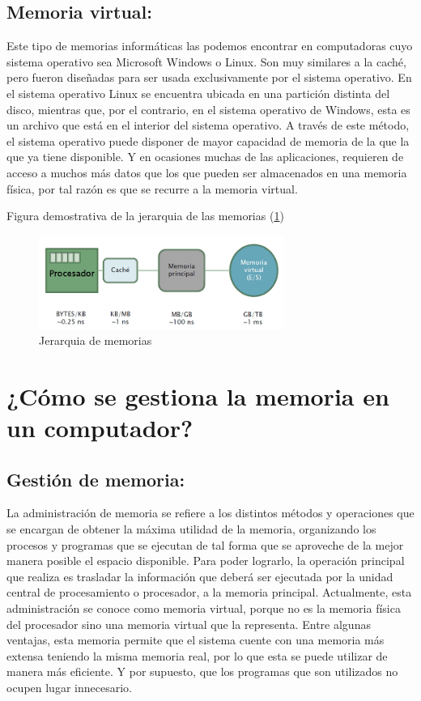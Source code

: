 \documentclass{article}
\begin{document}
\subsection{Memoria virtual:}
Este tipo de memorias informáticas las podemos encontrar en computadoras cuyo sistema operativo sea Microsoft Windows o Linux. Son muy similares a la caché, pero fueron diseñadas para ser usada exclusivamente por el sistema operativo. En el sistema operativo Linux se encuentra ubicada en una partición distinta del disco, mientras que, por el contrario, en el sistema operativo de Windows, esta es un archivo que está en el interior del sistema operativo.\newline
A través de este método, el sistema operativo puede disponer de mayor capacidad de memoria de la que la que ya tiene disponible. Y en ocasiones muchas de las aplicaciones, requieren de acceso a muchos más datos que los que pueden ser almacenados en una memoria física, por tal razón es que se recurre a la memoria virtual.\cite{Google}\newline

Figura demostrativa de la jerarquia de las memorias (\ref{fig_mem})\newline

\begin{figure}[h]
\includegraphics[width=8cm]{virtual.png}
\centering
\caption{Jerarquia de memorias}
\label{fig_mem}
\end{figure}

\section{¿Cómo se gestiona la memoria en un computador?}
\subsection{Gestión de memoria:}
La administración de memoria se refiere a los distintos métodos y operaciones que se encargan de obtener la máxima utilidad de la memoria, organizando los procesos y programas que se ejecutan de tal forma que se aproveche de la mejor manera posible el espacio disponible.\newline
Para poder lograrlo, la operación principal que realiza es trasladar la información que deberá ser ejecutada por la unidad central de procesamiento o procesador, a la memoria principal. Actualmente, esta administración se conoce como memoria virtual, porque no es la memoria física del procesador sino una memoria virtual que la representa. Entre algunas ventajas, esta memoria permite que el sistema cuente con una memoria más extensa teniendo la misma memoria real, por lo que esta se puede utilizar de manera más eficiente. Y por supuesto, que los programas que son utilizados no ocupen lugar innecesario.\newline
\end{document}

